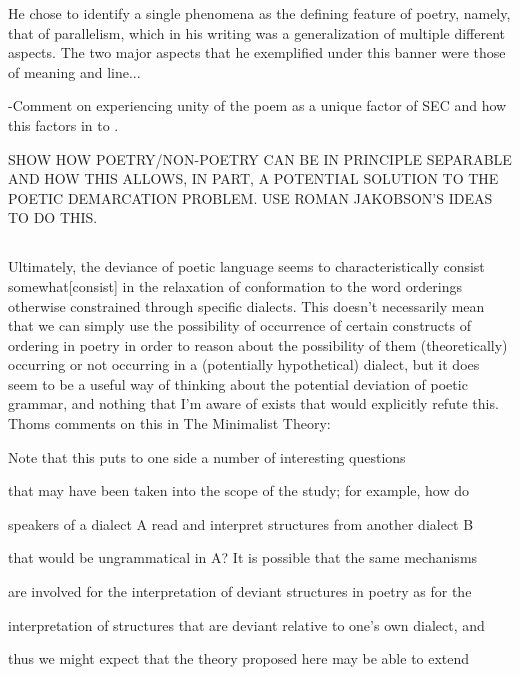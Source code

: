 \documentclass[]{article}
\begin{document}
He chose to identify a single phenomena as the defining feature of poetry, namely, that of parallelism, which in his writing was a generalization of multiple different aspects. The two major aspects that he exemplified under this banner were those of meaning and line...



-Comment on experiencing unity of the poem as a unique factor of SEC and how this factors in to .



SHOW HOW POETRY/NON-POETRY CAN BE IN PRINCIPLE SEPARABLE AND HOW THIS ALLOWS, IN PART, A POTENTIAL SOLUTION TO THE POETIC DEMARCATION PROBLEM. USE ROMAN JAKOBSON'S IDEAS TO DO THIS. 



\subsection{}



Ultimately, the deviance of poetic language seems to characteristically consist somewhat[consist] in the relaxation of conformation to the word orderings otherwise constrained through specific dialects. This doesn't necessarily mean that we can simply use the possibility of occurrence of certain constructs of ordering in poetry in order to reason about the possibility of them (theoretically) occurring or not occurring in a (potentially hypothetical) dialect, but it does seem to be a useful way of thinking about the potential deviation of poetic grammar, and nothing that I'm aware of exists that would explicitly refute this. Thoms comments on this in The Minimalist Theory:



Note that this puts to one side a number of interesting questions

that may have been taken into the scope of the study; for example, how do

speakers of a dialect A read and interpret structures from another dialect B

that would be ungrammatical in A? It is possible that the same mechanisms

are involved for the interpretation of deviant structures in poetry as for the

interpretation of structures that are deviant relative to one’s own dialect, and

thus we might expect that the theory proposed here may be able to extend
\end{document}
